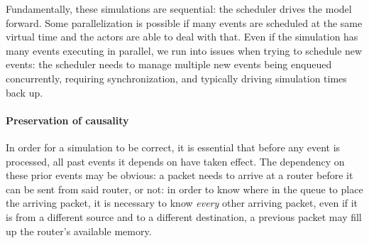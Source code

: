Fundamentally, these simulations are sequential: the scheduler drives the model forward.
Some parallelization is possible if many events are scheduled at the same virtual time and the actors are able to deal with that.
Even if the simulation has many events executing in parallel, we run into issues when  trying to schedule new events: the scheduler needs to manage multiple new events being enqueued concurrently, requiring synchronization, and typically driving simulation times back up.





\paragraph{Preservation of causality}

In order for a simulation to be correct, it is essential that before any event is processed, all past events it depends on have taken effect.
The dependency on these prior events may be obvious: a packet needs to arrive at a router before it can be sent from said router, or not: in order to know where in the queue to place the arriving packet, it is necessary to know \emph{every} other arriving packet, even if it is from a different source and to a different destination, a previous packet may fill up the router's available memory.

